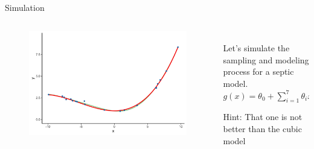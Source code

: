 \documentclass[aspectratio=169]{../latex_main/tntbeamer}  %
\begin{document}
	\begin{frame}[c]{Simulation}
	  \begin{columns}
	      \begin{column}{.6\textwidth}
	           \begin{figure}
	               \includegraphics[scale=.5]{Bild12}
	           \end{figure} 
	      \end{column}
	      
	      \begin{column}{.4\textwidth}
	      \\
	      \bigskip
	      \bigskip
	      \bigskip
	           Let’s simulate the sampling and modeling process for a \alert{septic model}.\\
	            $g(x) = \theta_0 + \sum\limits_{i=1}^7 \theta_ix^i$
	            
	            \alert{Hint}: That one is not better than the cubic model
	      \end{column}
	      
	  \end{columns}
	\end{frame}
	
	     
	      
	      
	       
	               
\end{document}
